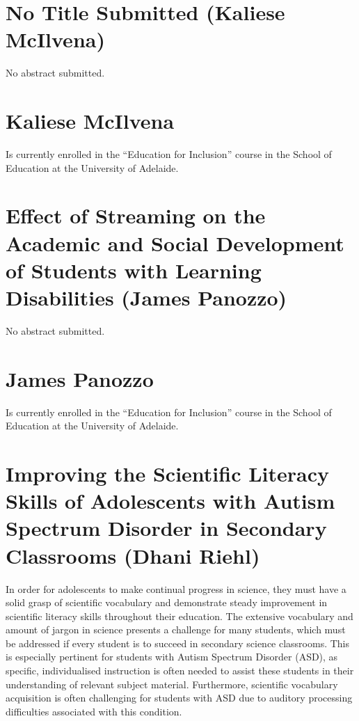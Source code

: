 \documentclass[twoside,14pt,a4paper,notitlepage]{memoir}
\begin{document}
\section*{No Title Submitted (Kaliese McIlvena)}
\label{aut:mcilvena}

No abstract submitted.

\section*{Kaliese McIlvena}

Is currently enrolled in the ``Education for Inclusion'' course in the School of Education at the University of Adelaide.



\section*{Effect of Streaming on the Academic and Social Development of Students with Learning Disabilities (James Panozzo)}
\label{aut:panozzo}

No abstract submitted.

\section*{James Panozzo}

Is currently enrolled in the ``Education for Inclusion'' course in the School of Education at the University of Adelaide.



\section*{Improving the Scientific Literacy Skills of Adolescents with Autism Spectrum Disorder in Secondary Classrooms (Dhani Riehl)}
\label{aut:riehl}

In order for adolescents to make continual progress in science, they must have a solid grasp of scientific vocabulary and demonstrate steady improvement in scientific literacy skills throughout their education. The extensive vocabulary and amount of jargon in science presents a challenge for many students, which must be addressed if every student is to succeed in secondary science classrooms. This is especially pertinent for students with Autism Spectrum Disorder (ASD), as specific, individualised instruction is often needed to assist these students in their understanding of relevant subject material. Furthermore, scientific vocabulary acquisition is often challenging for students with ASD due to auditory processing difficulties associated with this condition.  
\end{document}

